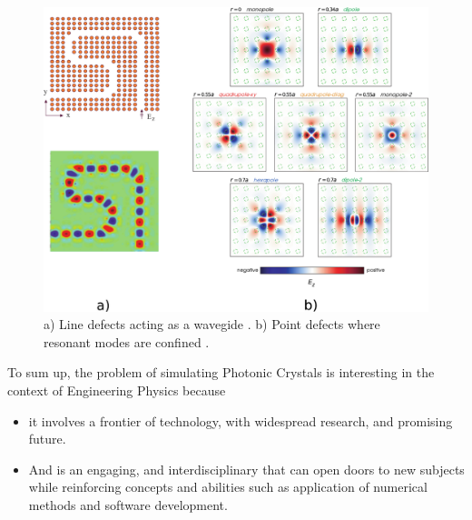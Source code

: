 \begin{figure}
\centering
\includegraphics[scale=0.7]{./img/pcs.pdf}
\caption{a) Line defects acting as a wavegide \cite{Jin2010}. b) Point defects where resonant modes are confined \cite{Joannopoulos2008}.}
\label{fig:guide_point}
\end{figure}

To sum up, the problem of simulating Photonic Crystals is interesting in the context of Engineering Physics because
\begin{itemize}
\item it involves a frontier of technology, with widespread research, and promising future.
\item And is an engaging, and interdisciplinary that can open doors to new subjects while reinforcing concepts and abilities such as application of numerical methods and software development.  
\end{itemize}